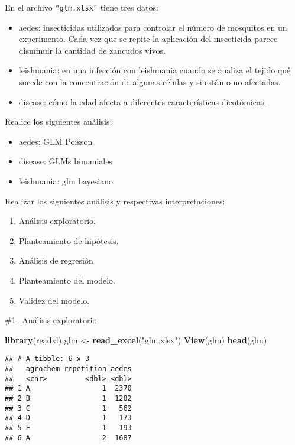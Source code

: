 \documentclass[
]{article}
\newenvironment{Shaded}{\begin{snugshade}}{\end{snugshade}}
\newcommand{\FunctionTok}[1]{\textcolor[rgb]{0.13,0.29,0.53}{\textbf{#1}}}
\newcommand{\NormalTok}[1]{#1}
\newcommand{\OtherTok}[1]{\textcolor[rgb]{0.56,0.35,0.01}{#1}}
\newcommand{\StringTok}[1]{\textcolor[rgb]{0.31,0.60,0.02}{#1}}
\begin{document}
En el archivo \texttt{"glm.xlsx"} tiene tres datos:

\begin{itemize}
\item
  aedes: insecticidas utilizados para controlar el número de mosquitos
  en un experimento. Cada vez que se repite la aplicación del
  insecticida parece disminuir la cantidad de zancudos vivos.
\item
  leishmania: en una infección con leishmania cuando se analiza el
  tejido qué sucede con la concentración de algunas células y si están o
  no afectadas.
\item
  disease: cómo la edad afecta a diferentes características dicotómicas.
\end{itemize}

Realice los siguientes análisis:

\begin{itemize}
\item
  aedes: GLM Poisson
\item
  disease: GLMs binomiales
\item
  leishmania: glm bayesiano
\end{itemize}

Realizar los siguientes análisis y respectivas interpretaciones:

\begin{enumerate}
\def\labelenumi{\arabic{enumi}.}
\item
  Análisis exploratorio.
\item
  Planteamiento de hipótesis.
\item
  Análisis de regresión
\item
  Planteamiento del modelo.
\item
  Validez del modelo.
\end{enumerate}

\#1\_Análisis exploratorio

\begin{Shaded}
\begin{Highlighting}[]
\FunctionTok{library}\NormalTok{(readxl)}
\NormalTok{glm }\OtherTok{\textless{}{-}} \FunctionTok{read\_excel}\NormalTok{(}\StringTok{"glm.xlsx"}\NormalTok{)}
\FunctionTok{View}\NormalTok{(glm)}
\FunctionTok{head}\NormalTok{(glm)}
\end{Highlighting}
\end{Shaded}

\begin{verbatim}
## # A tibble: 6 x 3
##   agrochem repetition aedes
##   <chr>         <dbl> <dbl>
## 1 A                 1  2370
## 2 B                 1  1282
## 3 C                 1   562
## 4 D                 1   173
## 5 E                 1   193
## 6 A                 2  1687
\end{verbatim}
\end{document}
